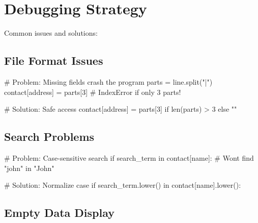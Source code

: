 \documentclass[
  letterpaper,
  DIV=11,
  numbers=noendperiod,
  oneside]{scrreprt}
\newenvironment{Shaded}{}{}
\newcommand{\BuiltInTok}[1]{\textcolor[rgb]{0.84,0.23,0.29}{#1}}
\newcommand{\CommentTok}[1]{\textcolor[rgb]{0.42,0.45,0.49}{#1}}
\newcommand{\ControlFlowTok}[1]{\textcolor[rgb]{0.84,0.23,0.29}{#1}}
\newcommand{\DecValTok}[1]{\textcolor[rgb]{0.00,0.36,0.77}{#1}}
\newcommand{\KeywordTok}[1]{\textcolor[rgb]{0.84,0.23,0.29}{#1}}
\newcommand{\NormalTok}[1]{\textcolor[rgb]{0.14,0.16,0.18}{#1}}
\newcommand{\OperatorTok}[1]{\textcolor[rgb]{0.14,0.16,0.18}{#1}}
\newcommand{\StringTok}[1]{\textcolor[rgb]{0.01,0.18,0.38}{#1}}
\begin{document}
\section{Debugging Strategy}\label{debugging-strategy-5}

Common issues and solutions:

\subsection{File Format Issues}\label{file-format-issues}

\begin{Shaded}
\begin{Highlighting}[]
\CommentTok{\# Problem: Missing fields crash the program}
\NormalTok{parts }\OperatorTok{=}\NormalTok{ line.split(}\StringTok{"|"}\NormalTok{)}
\NormalTok{contact[}\StringTok{\textquotesingle{}address\textquotesingle{}}\NormalTok{] }\OperatorTok{=}\NormalTok{ parts[}\DecValTok{3}\NormalTok{]  }\CommentTok{\# IndexError if only 3 parts!}

\CommentTok{\# Solution: Safe access}
\NormalTok{contact[}\StringTok{\textquotesingle{}address\textquotesingle{}}\NormalTok{] }\OperatorTok{=}\NormalTok{ parts[}\DecValTok{3}\NormalTok{] }\ControlFlowTok{if} \BuiltInTok{len}\NormalTok{(parts) }\OperatorTok{\textgreater{}} \DecValTok{3} \ControlFlowTok{else} \StringTok{""}
\end{Highlighting}
\end{Shaded}

\subsection{Search Problems}\label{search-problems}

\begin{Shaded}
\begin{Highlighting}[]
\CommentTok{\# Problem: Case{-}sensitive search}
\ControlFlowTok{if}\NormalTok{ search\_term }\KeywordTok{in}\NormalTok{ contact[}\StringTok{\textquotesingle{}name\textquotesingle{}}\NormalTok{]:  }\CommentTok{\# Won\textquotesingle{}t find "john" in "John"}

\CommentTok{\# Solution: Normalize case}
\ControlFlowTok{if}\NormalTok{ search\_term.lower() }\KeywordTok{in}\NormalTok{ contact[}\StringTok{\textquotesingle{}name\textquotesingle{}}\NormalTok{].lower():}
\end{Highlighting}
\end{Shaded}

\subsection{Empty Data Display}\label{empty-data-display}
\end{document}
